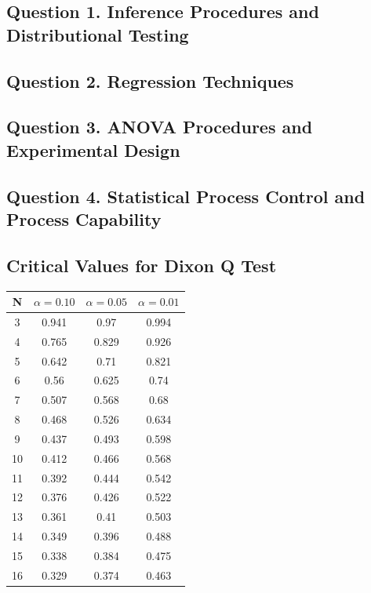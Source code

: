 \documentclass[a4paper,12pt]{article}
\begin{document}
\subsection*{Question 1. Inference Procedures and Distributional Testing }
\newpage
\subsection*{Question 2. Regression Techniques}
\newpage
\subsection*{Question 3. ANOVA Procedures and Experimental Design}

\newpage
\subsection*{Question 4. Statistical Process Control and Process Capability}

\newpage
\subsection*{Critical Values for Dixon Q Test}
\begin{center}
	\begin{tabular}{|c|c|c|c|}
		\hline  N  & $\alpha=0.10$  & $\alpha=0.05$  & $\alpha=0.01$  \\ \hline
		3  & 0.941 & 0.97  & 0.994 \\ \hline
		4  & 0.765 & 0.829 & 0.926 \\ \hline
		5  & 0.642 & 0.71  & 0.821 \\ \hline
		6  & 0.56  & 0.625 & 0.74  \\ \hline
		7  & 0.507 & 0.568 & 0.68  \\ \hline
		8  & 0.468 & 0.526 & 0.634 \\ \hline
		9  & 0.437 & 0.493 & 0.598 \\ \hline
		10 & 0.412 & 0.466 & 0.568 \\ \hline
		11 & 0.392 & 0.444 & 0.542 \\ \hline
		12 & 0.376 & 0.426 & 0.522 \\ \hline
		13 & 0.361 & 0.41  & 0.503 \\ \hline
		14 & 0.349 & 0.396 & 0.488 \\ \hline
		15 & 0.338 & 0.384 & 0.475 \\ \hline
		16 & 0.329 & 0.374 & 0.463 \\ \hline
	\end{tabular} 
\end{center}
\end{document}
